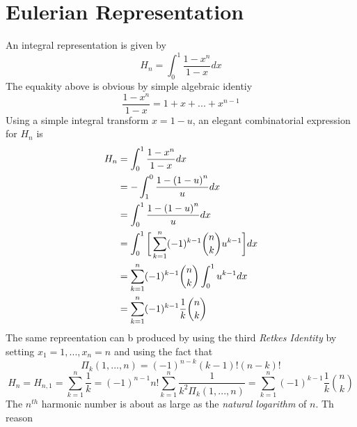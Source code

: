 \documentclass{article}
\begin{document}
\section{Eulerian Representation}
An integral representation is given by
\begin{equation}
H_{n} = \int_{0}^{1} \frac{1-x^n}{1-x} dx \label{Euler equation}
\end{equation}
The equakity above is obvious by simple algebraic identiy
\begin{equation}
\frac{1-x^n}{1-x} = 1+x+...+x^{n-1}
\end{equation}
Using a simple integral transform ${x = 1-u}$, an elegant combinatorial expression for $H_{n}$ is
\begin{align}
H_{n} &= \int_{0}^{1} \frac{1-x^n}{1-x} dx \\
	 &= -\int_{1}^{0} \frac{1-{(1-u)}^n}{u} dx \\
	 &= \int_{0}^{1} \frac{1-{(1-u)}^n}{u} dx \\
	 &= \int_{0}^{1} \bigg{[}\sum_{k=1}^{n} (-1)^{k-1} {n \choose k} u^{k-1}\bigg{]}dx \\
	 &= \sum_{k=1}^{n} (-1)^{k-1} {n \choose k} \int_{0}^{1} u^{k-1} dx\\
	 &= \sum_{k=1}^{n} (-1)^{k-1} \frac{1}{k} {n \choose k}
\end{align}
The same repreentation can b produced by using the third \emph{Retkes Identity} by setting $x_{1} = 1, . . . , x_{n} = n$ and using the fact that
\begin{equation}
{\Pi}_{k}(1, . . . , n) = {(-1)}^{n-k} (k-1)!(n-k)!
\end{equation}
\begin{equation}
H_{n}=H_{n,1}=\sum_{k=1}^{n} \frac{1}{k} = {(-1)}^{n-1}n!\sum_{k=1}^{n}\frac{1}{k^{2}{\Pi}_{k}(1, . . . ,n)}=\sum_{k=1}^{n}{(-1)}^{k-1}\frac{1}{k}{n \choose k}
\end{equation}
The $n^{th}$ harmonic number is about as large as the \emph{natural logarithm} of $n$. Th reason 
\end{document}
